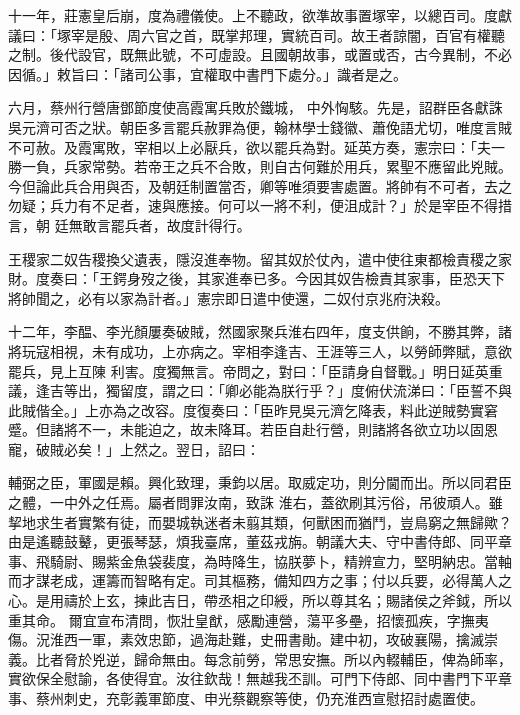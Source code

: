 \begin{pinyinscope}
 十一年，莊憲皇后崩，度為禮儀使。上不聽政，欲準故事置塚宰，以總百司。度獻議曰：「塚宰是殷、周六官之首，既掌邦理，實統百司。故王者諒闇，百官有權聽之制。後代設官，既無此號，不可虛設。且國朝故事，或置或否，古今異制，不必因循。」敕旨曰：「諸司公事，宜權取中書門下處分。」識者是之。



 六月，蔡州行營唐鄧節度使高霞寓兵敗於鐵城，
 中外恟駭。先是，詔群臣各獻誅吳元濟可否之狀。朝臣多言罷兵赦罪為便，翰林學士錢徽、蕭俛語尤切，唯度言賊不可赦。及霞寓敗，宰相以上必厭兵，欲以罷兵為對。延英方奏，憲宗曰：「夫一勝一負，兵家常勢。若帝王之兵不合敗，則自古何難於用兵，累聖不應留此兇賊。今但論此兵合用與否，及朝廷制置當否，卿等唯須要害處置。將帥有不可者，去之勿疑；兵力有不足者，速與應接。何可以一將不利，便沮成計？」於是宰臣不得措言，朝
 廷無敢言罷兵者，故度計得行。



 王稷家二奴告稷換父遺表，隱沒進奉物。留其奴於仗內，遣中使往東都檢責稷之家財。度奏曰：「王鍔身歿之後，其家進奉已多。今因其奴告檢責其家事，臣恐天下將帥聞之，必有以家為計者。」憲宗即日遣中使還，二奴付京兆府決殺。



 十二年，李醖、李光顏屢奏破賊，然國家聚兵淮右四年，度支供餉，不勝其弊，諸將玩寇相視，未有成功，上亦病之。宰相李逢吉、王涯等三人，以勞師弊賦，意欲罷兵，見上互陳
 利害。度獨無言。帝問之，對曰：「臣請身自督戰。」明日延英重議，逢吉等出，獨留度，謂之曰：「卿必能為朕行乎？」度俯伏流涕曰：「臣誓不與此賊偕全。」上亦為之改容。度復奏曰：「臣昨見吳元濟乞降表，料此逆賊勢實窘蹙。但諸將不一，未能迫之，故未降耳。若臣自赴行營，則諸將各欲立功以固恩寵，破賊必矣！」上然之。翌日，詔曰：



 輔弼之臣，軍國是賴。興化致理，秉鈞以居。取威定功，則分閫而出。所以同君臣之體，一中外之任焉。屬者問罪汝南，致誅
 淮右，蓋欲刷其污俗，吊彼頑人。雖挈地求生者實繁有徒，而嬰城執迷者未翦其類，何獸困而猶鬥，豈鳥窮之無歸歟？由是遙聽鼓鼙，更張琴瑟，煩我臺席，董茲戎旃。朝議大夫、守中書侍郎、同平章事、飛騎尉、賜紫金魚袋裴度，為時降生，協朕夢卜，精辨宣力，堅明納忠。當軸而才謀老成，運籌而智略有定。司其樞務，備知四方之事；付以兵要，必得萬人之心。是用禱於上玄，揀此吉日，帶丞相之印綬，所以尊其名；賜諸侯之斧鉞，所以重其命。
 爾宜宣布清問，恢壯皇猷，感勵連營，蕩平多壘，招懷孤疾，字撫夷傷。況淮西一軍，素效忠節，過海赴難，史冊書勛。建中初，攻破襄陽，擒滅崇義。比者脅於兇逆，歸命無由。每念前勞，常思安撫。所以內輟輔臣，俾為師率，實欲保全慰諭，各使得宜。汝往欽哉！無越我丕訓。可門下侍郎、同中書門下平章事、蔡州刺史，充彰義軍節度、申光蔡觀察等使，仍充淮西宣慰招討處置使。




\end{pinyinscope}
